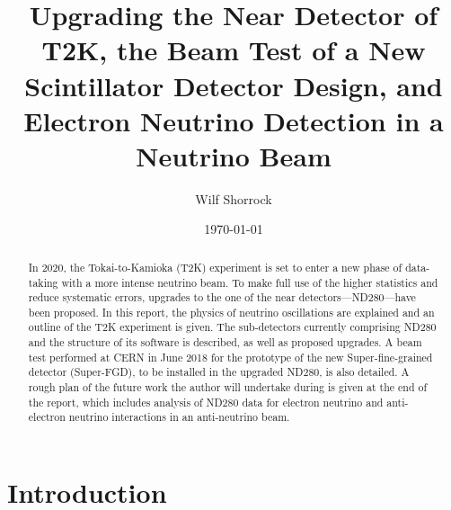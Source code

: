\documentclass[aps,pra,12pt,notitlepage,tightenlines]{revtex4-1}
\begin{document}
\title{Upgrading the Near Detector of T2K, the Beam Test of a New Scintillator Detector Design, and Electron Neutrino Detection in a Neutrino Beam \vspace{0mm}}
\author{Wilf Shorrock\vspace{1mm}}
\date{\today}
\begin{abstract}
\linespread{0.97}
\vspace{1mm} In 2020, the Tokai-to-Kamioka (T2K) experiment is set to enter a new phase of data-taking with a more intense neutrino beam. To make full use of the higher statistics and reduce systematic errors, upgrades to the one of the near detectors---ND280---have been proposed. In this report, the physics of neutrino oscillations are explained and an outline of the T2K experiment is given. The sub-detectors currently comprising ND280 and the structure of its software is described, as well as proposed upgrades. A beam test performed at CERN in June 2018 for the prototype of the new Super-fine-grained detector (Super-FGD), to be installed in the upgraded ND280, is also detailed. A rough plan of the future work the author will undertake during is given at the end of the report, which includes analysis of ND280 data for electron neutrino and anti-electron neutrino interactions in an anti-neutrino beam.
\end{abstract}

\maketitle

\newpage
\tableofcontents
\newpage

\vspace{-8mm}

\section{Introduction}
\end{document}

